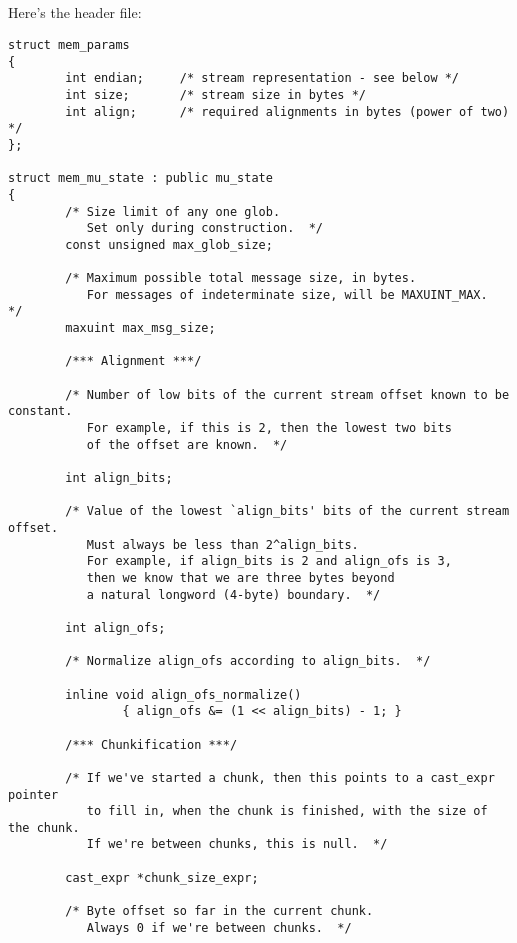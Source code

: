 
\subsection{\mmus{}}

Here's the header file:

\begin{verbatim}
struct mem_params
{
        int endian;     /* stream representation - see below */
        int size;       /* stream size in bytes */
        int align;      /* required alignments in bytes (power of two) */
};

struct mem_mu_state : public mu_state
{
        /* Size limit of any one glob.
           Set only during construction.  */
        const unsigned max_glob_size;

        /* Maximum possible total message size, in bytes.
           For messages of indeterminate size, will be MAXUINT_MAX.  */
        maxuint max_msg_size;

        /*** Alignment ***/

        /* Number of low bits of the current stream offset known to be constant.
           For example, if this is 2, then the lowest two bits
           of the offset are known.  */

        int align_bits;

        /* Value of the lowest `align_bits' bits of the current stream offset.
           Must always be less than 2^align_bits.
           For example, if align_bits is 2 and align_ofs is 3,
           then we know that we are three bytes beyond
           a natural longword (4-byte) boundary.  */

        int align_ofs;

        /* Normalize align_ofs according to align_bits.  */

        inline void align_ofs_normalize()
                { align_ofs &= (1 << align_bits) - 1; }

        /*** Chunkification ***/

        /* If we've started a chunk, then this points to a cast_expr pointer
           to fill in, when the chunk is finished, with the size of the chunk.
           If we're between chunks, this is null.  */

        cast_expr *chunk_size_expr;

        /* Byte offset so far in the current chunk.
           Always 0 if we're between chunks.  */


\end{verbatim}
